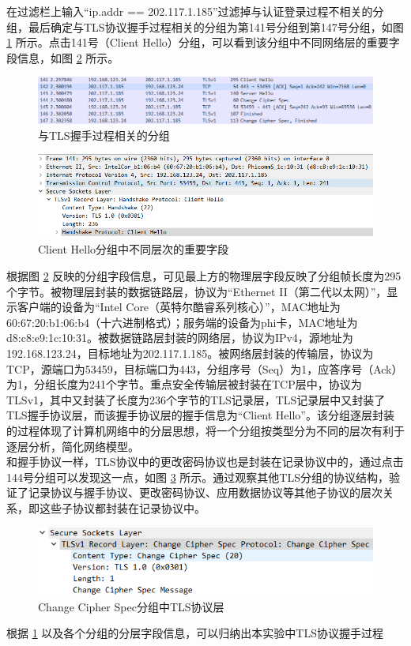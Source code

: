 \qquad
在过滤栏上输入“ip.addr == 202.117.1.185”过滤掉与认证登录过程不相关的分组，最后确定与TLS协议握手过程相关的分组为第141号分组到第147号分组，如图 \ref{fig6} 所示。点击141号（Client Hello）分组，可以看到该分组中不同网络层的重要字段信息，如图 \ref{fig7} 所示。\\
\begin{figure}
	\centering
	\includegraphics[width=12cm]{image/TLS-1}
	\caption{与TLS握手过程相关的分组}
	\label{fig6}
\end{figure}
\begin{figure}
	\centering
	\includegraphics[width=12cm]{image/layer-1}
	\caption{Client Hello分组中不同层次的重要字段}
	\label{fig7}
\end{figure}
\qquad
根据图 \ref{fig7} 反映的分组字段信息，可见最上方的物理层字段反映了分组帧长度为295个字节。被物理层封装的数据链路层，协议为“Ethernet II（第二代以太网）”，显示客户端的设备为“Intel Core（英特尔酷睿系列核心）”，MAC地址为60:67:20:b1:06:b4（十六进制格式）；服务端的设备为phi卡，MAC地址为d8:c8:e9:1c:10:31。被数据链路层封装的网络层，协议为IPv4，源地址为192.168.123.24，目标地址为202.117.1.185。被网络层封装的传输层，协议为TCP，源端口为53459，目标端口为443，分组序号（Seq）为1，应答序号（Ack）为1，分组长度为241个字节。重点安全传输层被封装在TCP层中，协议为TLSv1，其中又封装了长度为236个字节的TLS记录层，TLS记录层中又封装了TLS握手协议层，而该握手协议层的握手信息为“Client Hello”。该分组逐层封装的过程体现了计算机网络中的分层思想，将一个分组按类型分为不同的层次有利于逐层分析，简化网络模型。\\
\qquad
和握手协议一样，TLS协议中的更改密码协议也是封装在记录协议中的，通过点击144号分组可以发现这一点，如图 \ref{fig8} 所示。通过观察其他TLS分组的协议结构，验证了记录协议与握手协议、更改密码协议、应用数据协议等其他子协议的层次关系，即这些子协议都封装在记录协议中。\\
\begin{figure}
	\centering
	\includegraphics[width=12cm]{image/layer-2}
	\caption{Change Cipher Spec分组中TLS协议层}
	\label{fig8}
\end{figure}
\qquad
根据 \ref{fig6} 以及各个分组的分层字段信息，可以归纳出本实验中TLS协议握手过程